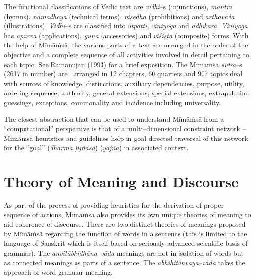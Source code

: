 The functional classifications of Vedic text are \textit{vidhi}–s (injunctions), \textit{mantra} (hymns), \textit{nāmadheya} (technical terms), \textit{niṣedha} (prohibitions) and \textit{arthavāda} (illustrations). \textit{Vidhi}–s are classified into \textit{utpatti, viniyoga} and \textit{adhikāra. Viniyoga} has \textit{apūrva} (applications), \textit{guṇa} (accessories) and \textit{viśiṣṭa} (composite) forms. With the help of Mīmāṁsā, the various parts of a text are arranged in the order of the objective and a complete sequence of all activities involved in detail pertaining to each topic. See Ramanujan (1993) for a brief exposition. The Mīmāṁsā \textit{sūtra}–s (2617 in number) are  arranged in 12 chapters, 60 quarters and 907 topics deal with sources of knowledge, distinctions, auxiliary dependencies, purpose, utility, ordering sequence, authority, general extensions, special extensions, extrapolation guessings, exceptions, commonality and incidence including universality.

The closest abstraction that can be used to understand Mīmāṁsā from a “computational” perspective is that of a multi–dimensional constraint network – Mīmāṁsā heuristics and guidelines help in goal directed traversal of this network for the “goal” (\textit{dharma jijñāsā}) (\textit{yajña}) in associated context.


\section*{Theory of Meaning and Discourse}

As part of the process of providing heuristics for the derivation of proper sequence of actions, Mīmāṁsā also provides its own unique theories of meaning to aid coherence of discourse. There are two distinct theories of meanings proposed by Mīmāṁsā regarding the function of words in a sentence (this is limited to the language of Sanskrit which is itself based on seriously advanced scientific basis of grammar). The \textit{anvitābhidhāna–vāda} meanings are not in isolation of words but as connected meanings as parts of a sentence. The \textit{abhihitānvaya–vāda} takes the approach of word granular meaning.

